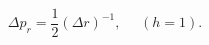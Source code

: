 \begin{equation}                              
\Delta p_{r} = \frac{1}{2} (\Delta r)^{-1}, ~~~~~~(h = 1).                              
\end{equation} 
